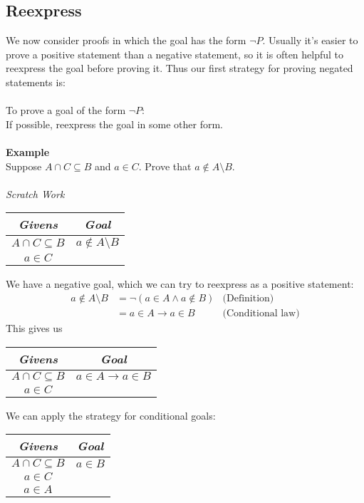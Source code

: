 \documentclass{report}
\begin{document}
\subsection{Reexpress}
We now consider proofs in which the goal has the form $\neg P$. Usually it's easier to prove a positive statement than a negative statement, so it is often helpful to reexpress the goal before
proving it. Thus our first strategy for proving negated statements is:\\
\vspace{1mm}\\
\indent To prove a goal of the form $\neg P$:\\
\indent If possible, reexpress the goal in some other form.\\
\vspace{1mm}\\
\textbf{Example}\\
Suppose $A\cap C\subseteq B$ and $a\in C$. Prove that $a\notin A\setminus B$.\\
\vspace{1mm}\\
\textit{Scratch Work}
\begin{center}
\begin{tabular}{c|c}
\textit{Givens}&\textit{Goal}\\
\hline
$A\cap C\subseteq B$&$a\notin A\setminus B$\\
$a\in C$&
\end{tabular}
\end{center}
We have a negative goal, which we can try to reexpress as a positive statement:
\begin{align*}
a\notin A\setminus B&=\neg(a\in A\land a\notin B)&\text{(Definition)}\\
&=a\in A\to a\in B&\text{(Conditional law)}
\end{align*}
This gives us
\begin{center}
\begin{tabular}{c|c}
\textit{Givens}&\textit{Goal}\\
\hline
$A\cap C\subseteq B$&$a\in A\to a\in B$\\
$a\in C$&
\end{tabular}
\end{center}
We can apply the strategy for conditional goals:
\begin{center}
\begin{tabular}{c|c}
\textit{Givens}&\textit{Goal}\\
\hline
$A\cap C\subseteq B$&$a\in B$\\
$a\in C$&\\
$a\in A$&
\end{tabular}
\end{center}
\end{document}
